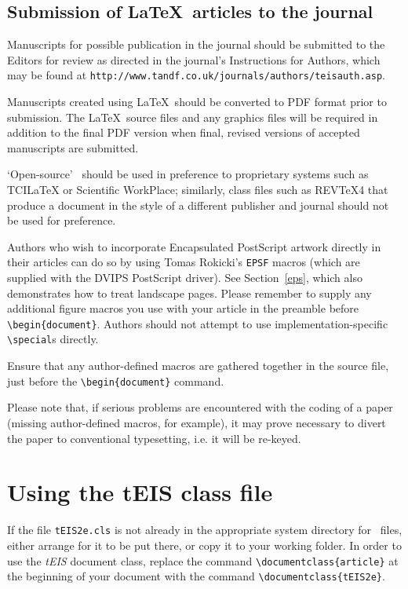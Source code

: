 \documentclass[]{tEIS2e}
\theoremstyle{plain}
\theoremstyle{remark}
\begin{document}
\subsection{Submission of \LaTeX\ articles to the journal}\label{S1.2}

Manuscripts for possible publication in the journal should be submitted to the Editors for review as directed in the journal's Instructions for Authors, which may be found at {\tt{http://www.tandf.co.uk/journals/authors/teisauth.asp}}.

Manuscripts created using \LaTeX\ should be converted to PDF format prior to submission. The \LaTeX\ source files and any graphics files will be required in addition to the final PDF version when final, revised versions of accepted manuscripts are submitted.

`Open-source' \LaTeXe\ should be used in preference to proprietary systems such as TCILaTeX or Scientific WorkPlace; similarly, class files such as REVTeX4 that produce a document in the style of a different publisher and journal should not be used for preference.

Authors who wish to incorporate Encapsulated PostScript artwork directly in their articles can do so by using
Tomas Rokicki's {\tt EPSF} macros (which are supplied with the DVIPS PostScript driver). See Section~\ref{eps},
which also demonstrates how to treat landscape pages. Please remember to supply any additional figure macros you
use with your article in the preamble before \verb"\begin{document}". Authors should not attempt to use
implementation-specific \verb"\special"s directly.

Ensure that any author-defined macros are gathered together in the source file, just before the
\verb"\begin{document}" command.

Please note that, if serious problems are encountered with the coding of a paper (missing author-defined macros,
for example), it may prove necessary to divert the paper to conventional typesetting, i.e. it will be re-keyed.


\section{Using the {\bi tEIS} class file}

If the file {\tt tEIS2e.cls} is not already in the appropriate system directory for \LaTeXe\ files, either
arrange for it to be put there, or copy it to your working folder. In order to use the {\it tEIS} document class, replace
the command \verb"\documentclass{article}" at the beginning of your document with the command \verb"\documentclass{tEIS2e}".
\end{document}

